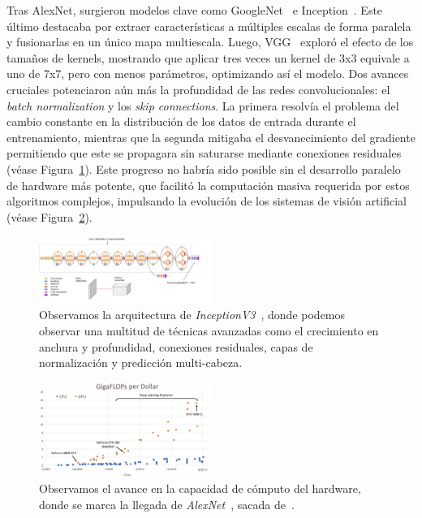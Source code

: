 \documentclass[12pt,letterpaper]{article}
\begin{document}
Tras AlexNet, surgieron modelos clave como GoogleNet~\cite{GoogleNet} e Inception~\cite{Inception}. 
Este último destacaba por extraer características a múltiples escalas de forma paralela y fusionarlas en un único mapa multiescala. 
Luego, VGG~\cite{VGG} exploró el efecto de los tamaños de kernels, mostrando que aplicar tres veces un kernel de 3x3 equivale a uno de 7x7, pero con menos parámetros, optimizando así el modelo.
Dos avances cruciales potenciaron aún más la profundidad de las redes convolucionales: el \textit{batch normalization} y los \textit{skip connections}. La primera resolvía el problema del cambio constante en 
la distribución de los datos de entrada durante el entrenamiento, mientras que la segunda mitigaba el desvanecimiento del gradiente permitiendo que este se propagara sin saturarse 
mediante conexiones residuales (véase Figura~\ref{fig:InceptionV3}).
Este progreso no habría sido posible sin el desarrollo paralelo de hardware más potente, 
que facilitó la computación masiva requerida por estos algoritmos complejos, impulsando la evolución de los sistemas de visión artificial (véase Figura~\ref{fig:FlopsPerDollar}).


\begin{figure}[!ht]
\begin{center}
    \includegraphics[width=0.5\textwidth]{InceptionV3}
\end{center}
\caption{Observamos la arquitectura de \textit{InceptionV3}~\cite{InceptionV3}, donde podemos observar una multitud de técnicas avanzadas como el crecimiento en anchura y profundidad, conexiones residuales, capas de normalización y predicción multi-cabeza.}
\label{fig:InceptionV3}
\end{figure}


\begin{figure}[!ht]
\begin{center}
    \includegraphics[width=0.5\textwidth]{FlopsPerDollar}
\end{center}
\caption{Observamos el avance en la capacidad de cómputo del hardware, donde se marca la llegada de \textit{AlexNet}~\cite{AlexNet}, sacada de~\cite{Lecture09}.}
\label{fig:FlopsPerDollar}
\end{figure}
\end{document}
